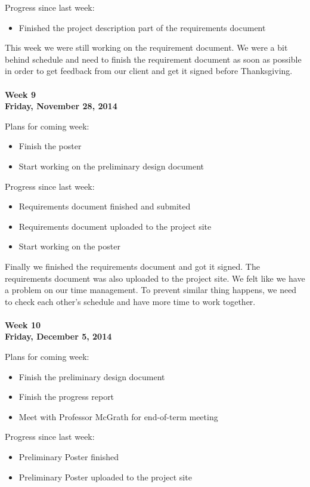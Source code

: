 \noindent Progress since last week:
\begin{itemize}
\item Finished the project description part of the requirements document
\end{itemize}

\noindent This week we were still working on the requirement document. We were a bit behind schedule and need to finish the requirement document as soon as possible in order to get feedback from our client and get it signed before Thanksgiving. \\
\\
\textbf{Week 9\\Friday, November 28, 2014\\}

\noindent Plans for coming week:
\begin{itemize}
\item Finish the poster
\item Start working on the preliminary design document
\end{itemize}

\noindent Progress since last week:
\begin{itemize}
\item Requirements document finished and submited
\item Requirements document uploaded to the project site
\item Start working on the poster
\end{itemize}

\noindent Finally we finished the requirements document and got it signed. The requirements document was also uploaded to the project site. We felt like we have a problem on our time management. To prevent similar thing happens, we need to check each other's schedule and have more time to work together. \\
\\
\textbf{Week 10\\Friday, December 5, 2014\\}

\noindent Plans for coming week:
\begin{itemize}
\item Finish the preliminary design document
\item Finish the progress report
\item Meet with Professor McGrath for end-of-term meeting
\end{itemize}

\noindent Progress since last week:
\begin{itemize}
\item Preliminary Poster finished
\item Preliminary Poster uploaded to the project site
\end{itemize}

